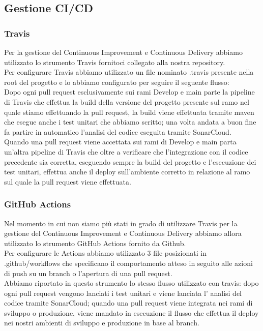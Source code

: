 \documentclass{article}
\begin{document}
\subsection{Gestione CI/CD}
\subsubsection{Travis}
Per la gestione del Continuous Improvement e Continuous Delivery abbiamo utilizzato lo strumento Travis fornitoci collegato alla nostra repository.\\
Per configurare Travis abbiamo utilizzato un file nominato .travis presente nella root del progetto e lo abbiamo configurato per seguire il seguente flusso:\\
Dopo ogni pull request esclusivamente sui rami Develop e main parte la pipeline di Travis che effettua la build della versione del progetto presente sul ramo nel quale stiamo effettuando la pull request, la build viene effettuata tramite maven che esegue anche i test unitari che abbiamo scritto; una volta andata a buon fine fa partire in automatico l’analisi del codice eseguita tramite SonarCloud.\\
Quando una pull request viene accettata sui rami di Develop e main parta un’altra pipeline di Travis che oltre a verificare che l’integrazione con il codice precedente sia corretta, eseguendo sempre la build del progetto e l’esecuzione dei test unitari, effettua anche il deploy sull’ambiente corretto in relazione al ramo sul quale la pull request viene effettuata.
\subsubsection{GitHub Actions}
Nel momento in cui non siamo più stati in grado di utilizzare Travis per la gestione del Continuous Improvement e Continuous Delivery abbiamo allora utilizzato lo strumento GitHub Actions fornito da Github.\\
Per configurare le Actions abbiamo utilizzato 3 file posizionati in .github/workflows che specificano il comportamento atteso in seguito alle azioni di push su un branch o l’apertura di una pull request.\\
Abbiamo riportato in questo strumento lo stesso flusso utilizzato con travis: dopo ogni pull request vengono lanciati i test unitari e viene lanciata l’ analisi del codice tramite SonarCloud; quando una pull request viene integrata nei rami di sviluppo o produzione, viene mandato in esecuzione il flusso che effettua il deploy nei nostri ambienti di sviluppo e produzione in base al branch.
\end{document}
